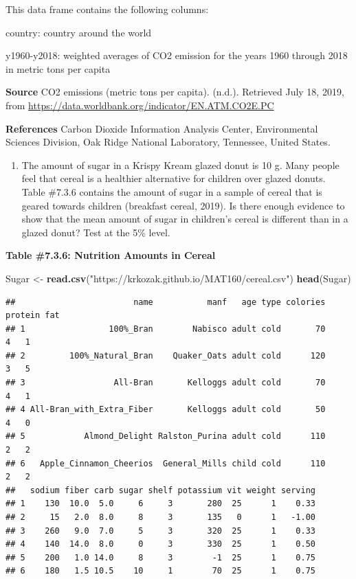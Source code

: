 \documentclass[]{book}
\newenvironment{Shaded}{\begin{snugshade}}{\end{snugshade}}
\newcommand{\KeywordTok}[1]{\textcolor[rgb]{0.13,0.29,0.53}{\textbf{#1}}}
\newcommand{\NormalTok}[1]{#1}
\newcommand{\StringTok}[1]{\textcolor[rgb]{0.31,0.60,0.02}{#1}}
\providecommand{\tightlist}{%
  \setlength{\itemsep}{0pt}\setlength{\parskip}{0pt}}
\begin{document}
This data frame contains the following columns:

country: country around the world

y1960-y2018: weighted averages of CO2 emission for the years 1960 through 2018 in metric tons per capita

\textbf{Source}
CO2 emissions (metric tons per capita). (n.d.). Retrieved July 18, 2019, from \url{https://data.worldbank.org/indicator/EN.ATM.CO2E.PC}

\textbf{References}
Carbon Dioxide Information Analysis Center, Environmental Sciences Division, Oak Ridge National Laboratory, Tennessee, United States.

\begin{enumerate}
\def\labelenumi{\arabic{enumi}.}
\setcounter{enumi}{1}
\tightlist
\item
  The amount of sugar in a Krispy Kream glazed donut is 10 g. Many people feel that cereal is a healthier alternative for children over glazed donuts. Table \#7.3.6 contains the amount of sugar in a sample of cereal that is geared towards children (breakfast cereal, 2019). Is there enough evidence to show that the mean amount of sugar in children's cereal is different than in a glazed donut? Test at the 5\% level.
\end{enumerate}

\textbf{Table \#7.3.6: Nutrition Amounts in Cereal}

\begin{Shaded}
\begin{Highlighting}[]
\NormalTok{Sugar <-}\StringTok{ }\KeywordTok{read.csv}\NormalTok{(}\StringTok{"https://krkozak.github.io/MAT160/cereal.csv"}\NormalTok{)}
\KeywordTok{head}\NormalTok{(Sugar)}
\end{Highlighting}
\end{Shaded}

\begin{verbatim}
##                        name           manf   age type colories protein fat
## 1                 100%_Bran        Nabisco adult cold       70       4   1
## 2         100%_Natural_Bran    Quaker_Oats adult cold      120       3   5
## 3                  All-Bran       Kelloggs adult cold       70       4   1
## 4 All-Bran_with_Extra_Fiber       Kelloggs adult cold       50       4   0
## 5            Almond_Delight Ralston_Purina adult cold      110       2   2
## 6   Apple_Cinnamon_Cheerios  General_Mills child cold      110       2   2
##   sodium fiber carb sugar shelf potassium vit weight serving
## 1    130  10.0  5.0     6     3       280  25      1    0.33
## 2     15   2.0  8.0     8     3       135   0      1   -1.00
## 3    260   9.0  7.0     5     3       320  25      1    0.33
## 4    140  14.0  8.0     0     3       330  25      1    0.50
## 5    200   1.0 14.0     8     3        -1  25      1    0.75
## 6    180   1.5 10.5    10     1        70  25      1    0.75
\end{verbatim}
\end{document}
